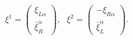 \begin{equation*}
  \xi^1 = \left(
    \begin{array}{c} 
      \xi_{L\alpha} \\ \bar{\xi}_R^{\dot{\alpha}}
    \end{array} \right), 
~~~ 
  \xi^2 = \left(
    \begin{array}{c}
      -\xi_{R\alpha} \\ \bar{\xi}_L^{\dot{\alpha}}
    \end{array} \right).
\end{equation*}

